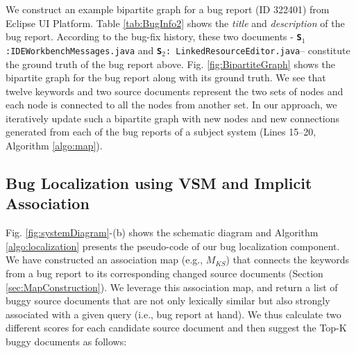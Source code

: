 \documentclass[sigconf,review,anonymous]{acmart}
\begin{document}
We construct an example bipartite graph for a bug report (ID 322401) from Eclipse UI Platform. Table \ref{tab:BugInfo2} shows the \textit{title} and \textit{description} of the bug report. According to the bug-fix history, these two documents - \texttt{\textbf{S$_1$}:IDEWorkbenchMessages.java} and \texttt{\textbf{S$_2$}: LinkedResourceEditor.java}-- constitute the ground truth of the bug report above. Fig. \ref{fig:BipartiteGraph} shows the bipartite graph for the bug report along with its ground truth. We see that twelve keywords and two source documents represent the two sets of nodes and each node is connected to all the nodes from another set. In our approach, we iteratively update such a bipartite graph with new nodes and new connections generated from each of the bug reports of a subject system (Lines 15--20, Algorithm \ref{algo:map}). 

\subsection{Bug Localization using VSM and Implicit Association}\label{sec:vsm-assoc-sore}
Fig. \ref{fig:systemDiagram}-(b) shows the schematic diagram
and Algorithm \ref{algo:localization} presents the pseudo-code
of our bug localization component.
We have constructed an association map (e.g., $M_{KS}$) that connects the keywords from a bug report to its corresponding changed source documents (Section \ref{sec:MapConstruction}). We leverage this association map, and return a list of buggy source documents that are not only lexically similar but also strongly associated with a given query (i.e., bug report at hand). We thus calculate two different scores for each candidate source document and then suggest the Top-K buggy documents as follows:
\end{document}
